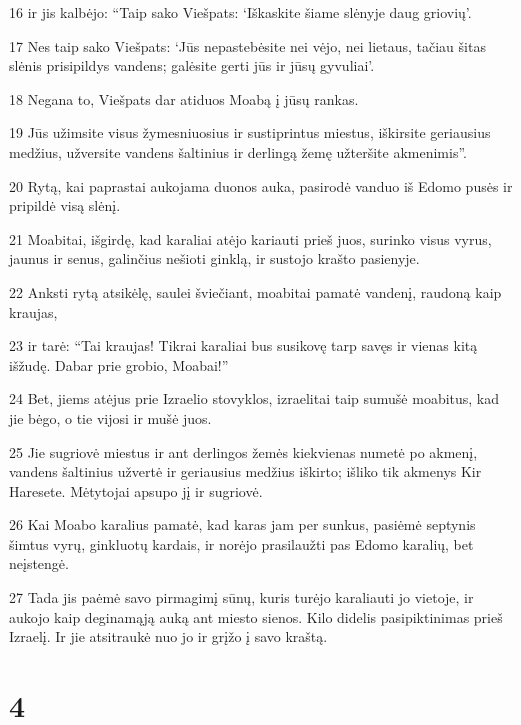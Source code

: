 \par 16 ir jis kalbėjo: “Taip sako Viešpats: ‘Iškaskite šiame slėnyje daug griovių’. 
\par 17 Nes taip sako Viešpats: ‘Jūs nepastebėsite nei vėjo, nei lietaus, tačiau šitas slėnis prisipildys vandens; galėsite gerti jūs ir jūsų gyvuliai’. 
\par 18 Negana to, Viešpats dar atiduos Moabą į jūsų rankas. 
\par 19 Jūs užimsite visus žymesniuosius ir sustiprintus miestus, iškirsite geriausius medžius, užversite vandens šaltinius ir derlingą žemę užteršite akmenimis”. 
\par 20 Rytą, kai paprastai aukojama duonos auka, pasirodė vanduo iš Edomo pusės ir pripildė visą slėnį. 
\par 21 Moabitai, išgirdę, kad karaliai atėjo kariauti prieš juos, surinko visus vyrus, jaunus ir senus, galinčius nešioti ginklą, ir sustojo krašto pasienyje. 
\par 22 Anksti rytą atsikėlę, saulei šviečiant, moabitai pamatė vandenį, raudoną kaip kraujas, 
\par 23 ir tarė: “Tai kraujas! Tikrai karaliai bus susikovę tarp savęs ir vienas kitą išžudę. Dabar prie grobio, Moabai!” 
\par 24 Bet, jiems atėjus prie Izraelio stovyklos, izraelitai taip sumušė moabitus, kad jie bėgo, o tie vijosi ir mušė juos. 
\par 25 Jie sugriovė miestus ir ant derlingos žemės kiekvienas numetė po akmenį, vandens šaltinius užvertė ir geriausius medžius iškirto; išliko tik akmenys Kir Haresete. Mėtytojai apsupo jį ir sugriovė. 
\par 26 Kai Moabo karalius pamatė, kad karas jam per sunkus, pasiėmė septynis šimtus vyrų, ginkluotų kardais, ir norėjo prasilaužti pas Edomo karalių, bet neįstengė. 
\par 27 Tada jis paėmė savo pirmagimį sūnų, kuris turėjo karaliauti jo vietoje, ir aukojo kaip deginamąją auką ant miesto sienos. Kilo didelis pasipiktinimas prieš Izraelį. Ir jie atsitraukė nuo jo ir grįžo į savo kraštą.



\chapter{4}


